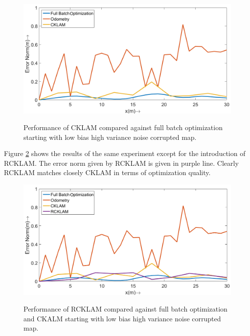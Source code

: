   
\begin{figure}
  \centering
    \includegraphics[width=1.00\textwidth]{images/Syn31_error_plot_CKLAM.png}
  \label{fig:Syn31_error_plot_CKLAM}
  \caption{Performance of CKLAM compared against full batch optimization starting with low bias high variance noise corrupted map.}
\end{figure}
  
  
  Figure \ref{fig:Syn31_error_plot} shows the results of the same experiment except for the introduction of RCKLAM. The error norm given by RCKLAM is given in purple line. Clearly RCKLAM matches closely CKLAM in terms of optimization quality.
    
  \begin{figure}
    \centering
      \includegraphics[width=1.00\textwidth]{images/Syn31_error_plot.png}
    \label{fig:Syn31_error_plot}
    \caption{Performance of RCKLAM compared against full batch optimization and CKALM starting with low bias high variance noise corrupted map.}
  \end{figure}
  
